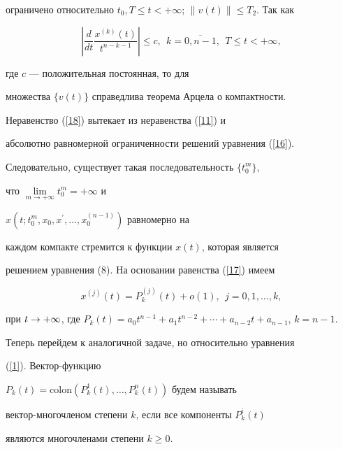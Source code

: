 \begin{pf}
ограничено относительно $t_{0}, T\leq t<+\infty$; $\|v(t)\|\leq


T_{2}$. Так как


\begin{equation}


\label{18}


\left|\frac{d}{dt}\frac{x^{(k)}(t)}{t^{n-k-1}}\right| \leq c,


\ \ k=\overline{0,n-1},\ \ T\leq t<+\infty,


\end{equation}


где $c$ --- положительная постоянная, то для


множества $\{ v(t) \}$ справедлива теорема Арцела о компактности.


Неравенство (\ref{18}) вытекает из неравенства (\ref{11}) и


абсолютно равномерной ограниченности решений уравнения (\ref{16}).


Следовательно, существует такая последовательность $\{t_{0}^{m}\}$,


что $\lim\limits_{m\rightarrow +\infty}t_{0}^{m}=+\infty$ и


$x(t;t_{0}^{m},x_{0}, x^{\prime},\dotsc,x^{(n-1)}_{0})$ равномерно на


каждом компакте стремится к функции $x(t)$, которая является


решением уравнения (8). Hа основании равенства (\ref{17}) имеем


$$


x^{(j)}(t)=P_{k}^{(j)}(t)+o (1),\ \ j=0,1,\dotsc,k,


$$


при $t\rar +\infty$, где $P_{k}(t)=


a_{0}t^{n-1}+a_{1}t^{n-2}+\dotsb +a_{n- 2}t+a_{n-1}$, $k=n-1$.


\end{pf}





Теперь перейдем к аналогичной задаче, но относительно уравнения


(\ref{1}). Вектор-функцию


$P_{k}(t)=\mathrm{colon}(P_{k}^{1}(t),\dotsc,P_{k}^{n}(t))$ будем называть


вектор-многочленом степени $k$, если все компоненты $P_{k}^{i}(t)$


являются многочленами степени $k\geq 0$.






